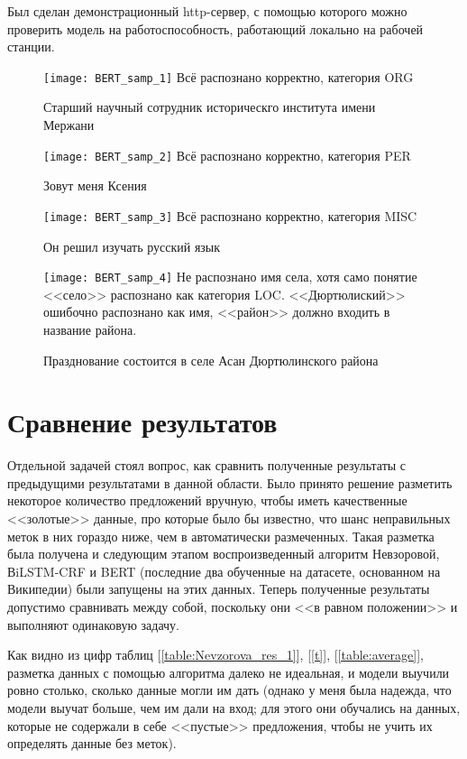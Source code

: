 Был сделан демонстрационный http-сервер, с помощью которого можно проверить модель на работоспособность, работающий локально на рабочей станции.


\begin{figure}[H]
\caption{Старший научный сотрудник историческго института имени Мержани}
\texttt{[image: BERT\_samp\_1]}
Всё распознано корректно, категория ORG
\label{fig:BERT_samp_1}
\end{figure}
\begin{figure}[H]
\caption{Зовут меня Ксения}
\texttt{[image: BERT\_samp\_2]}
Всё распознано корректно, категория PER
\label{fig:BERT_samp_2}
\end{figure}
\begin{figure}[H]
\caption{Он решил изучать русский язык}
\texttt{[image: BERT\_samp\_3]}
Всё распознано корректно, категория MISC
\label{fig:BERT_samp_3}
\end{figure}
\begin{figure}[H]
\caption{Празднование состоится в селе Асан Дюртюлинского района}
\texttt{[image: BERT\_samp\_4]}
Не распознано имя села, хотя само понятие <<село>> распознано как категория LOC. <<Дюртюлиский>> ошибочно распознано как имя, <<район>> должно входить в название района.
\label{fig:BERT_samp_4}
\end{figure}



\section{Сравнение результатов}

Отдельной задачей стоял вопрос, как сравнить полученные результаты с предыдущими результатами в данной области. Было принято решение разметить некоторое количество предложений вручную, чтобы иметь качественные <<золотые>> данные, про которые было бы известно, что шанс неправильных меток в них гораздо ниже, чем в автоматически размеченных. Такая разметка была получена и следующим этапом воспроизведенный алгоритм Невзоровой, ВiLSTM-CRF и BERT (последние два обученные на датасете, основанном на Википедии) были запущены на этих данных. Теперь полученные результаты допустимо сравнивать между собой, поскольку они <<в равном положении>> и выполняют одинаковую задачу.

Как видно из цифр таблиц [\ref{table:Nevzorova_res_1}], [\ref{t}], [\ref{table:average}], разметка данных с помощью алгоритма далеко не идеальная, и модели выучили ровно столько, сколько данные могли им дать (однако у меня была надежда, что модели выучат больше, чем им дали на вход; для этого они обучались на данных, которые не содержали в себе <<пустые>> предложения, чтобы не учить их определять данные без меток). 

